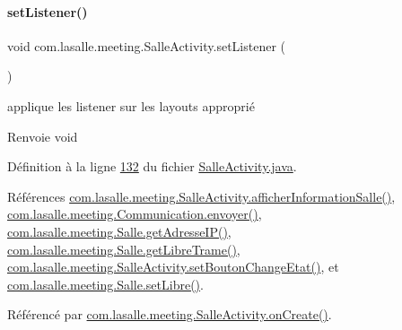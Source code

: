 \paragraph{\texorpdfstring{set\+Listener()}{setListener()}}
{\footnotesize\ttfamily void com.\+lasalle.\+meeting.\+Salle\+Activity.\+set\+Listener (\begin{DoxyParamCaption}{ }\end{DoxyParamCaption})}



applique les listener sur les layouts approprié 

\begin{DoxyReturn}{Renvoie}
void 
\end{DoxyReturn}


Définition à la ligne \hyperlink{_salle_activity_8java_source_l00132}{132} du fichier \hyperlink{_salle_activity_8java_source}{Salle\+Activity.\+java}.



Références \hyperlink{_salle_activity_8java_source_l00103}{com.\+lasalle.\+meeting.\+Salle\+Activity.\+afficher\+Information\+Salle()}, \hyperlink{_communication_8java_source_l00161}{com.\+lasalle.\+meeting.\+Communication.\+envoyer()}, \hyperlink{_salle_8java_source_l00285}{com.\+lasalle.\+meeting.\+Salle.\+get\+Adresse\+I\+P()}, \hyperlink{_salle_8java_source_l00183}{com.\+lasalle.\+meeting.\+Salle.\+get\+Libre\+Trame()}, \hyperlink{_salle_activity_8java_source_l00085}{com.\+lasalle.\+meeting.\+Salle\+Activity.\+set\+Bouton\+Change\+Etat()}, et \hyperlink{_salle_8java_source_l00089}{com.\+lasalle.\+meeting.\+Salle.\+set\+Libre()}.



Référencé par \hyperlink{_salle_activity_8java_source_l00060}{com.\+lasalle.\+meeting.\+Salle\+Activity.\+on\+Create()}.


